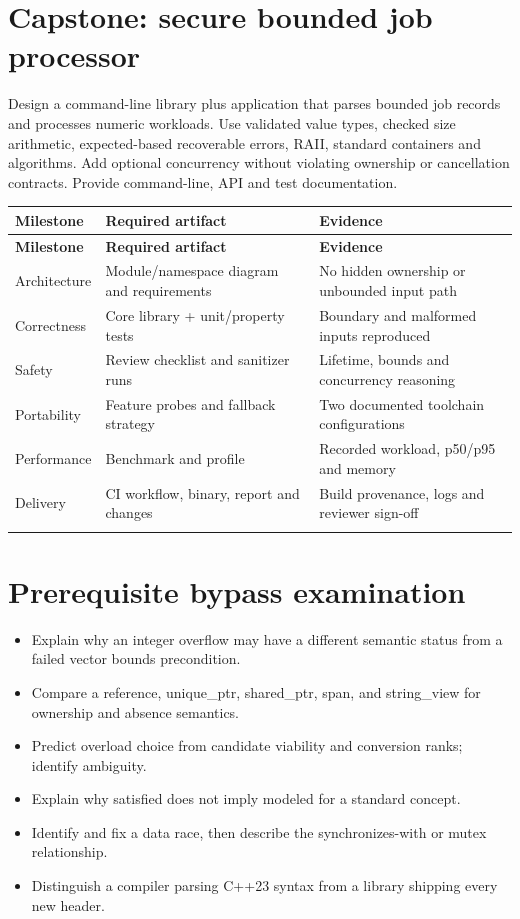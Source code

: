 \documentclass[11pt]{article}
\begin{document}
\section{Capstone: secure bounded job processor}
Design a command-line library plus application that parses bounded job records and processes numeric workloads. Use validated value types, checked size arithmetic, expected-based recoverable errors, RAII, standard containers and algorithms. Add optional concurrency without violating ownership or cancellation contracts. Provide command-line, API and test documentation.

\small
\begin{longtable}{@{}>{\raggedright\arraybackslash}p{.22\linewidth}>{\raggedright\arraybackslash}p{.34\linewidth}>{\raggedright\arraybackslash}p{}@{}}
\toprule
\textbf{Milestone} & \textbf{Required artifact} & \textbf{Evidence}\\
\midrule
\endfirsthead
\toprule
\textbf{Milestone} & \textbf{Required artifact} & \textbf{Evidence}\\
\midrule
\endhead
Architecture & Module/namespace diagram and requirements & No hidden ownership or unbounded input path\\
\addlinespace[2pt]
Correctness & Core library + unit/property tests & Boundary and malformed inputs reproduced\\
\addlinespace[2pt]
Safety & Review checklist and sanitizer runs & Lifetime, bounds and concurrency reasoning\\
\addlinespace[2pt]
Portability & Feature probes and fallback strategy & Two documented toolchain configurations\\
\addlinespace[2pt]
Performance & Benchmark and profile & Recorded workload, p50/p95 and memory\\
\addlinespace[2pt]
Delivery & CI workflow, binary, report and changes & Build provenance, logs and reviewer sign-off\\
\addlinespace[2pt]
\bottomrule
\end{longtable}
\normalsize
\section{Prerequisite bypass examination}
\begin{itemize}[leftmargin=*,itemsep=1pt,topsep=3pt]
\item Explain why an integer overflow may have a different semantic status from a failed vector bounds precondition.
\item Compare a reference, unique\_ptr, shared\_ptr, span, and string\_view for ownership and absence semantics.
\item Predict overload choice from candidate viability and conversion ranks; identify ambiguity.
\item Explain why satisfied does not imply modeled for a standard concept.
\item Identify and fix a data race, then describe the synchronizes-with or mutex relationship.
\item Distinguish a compiler parsing C++23 syntax from a library shipping every new header.
\end{itemize}
\end{document}

